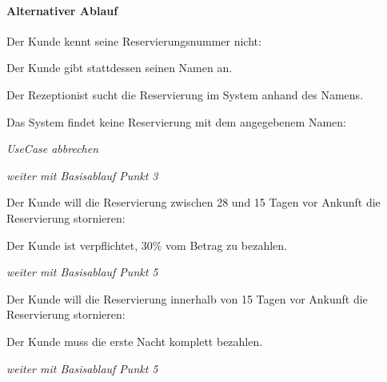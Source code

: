 \paragraph{Alternativer Ablauf}
\begin{longenum}
	\item
	\begin{longenum}
		\item Der \Gls{Kunde} kennt seine \Gls{Reservierungsnummer} nicht:
		\begin{longenum}
			\item Der \Gls{Kunde} gibt stattdessen seinen Namen an.
			\item Der \Gls{Rezeptionist} sucht die \Gls{Reservierung} im System anhand des Namens.
			\begin{longenum}
				\item Das System findet keine \Gls{Reservierung} mit dem angegebenem Namen:
				\begin{longenum}
					\item \emph{UseCase abbrechen}
				\end{longenum}
			\end{longenum}
			\item \emph{weiter mit Basisablauf Punkt 3}
		\end{longenum}
	\end{longenum}
	
	\item
	\item
	\item
	\begin{longenum}
		\item Der \Gls{Kunde} will die Reservierung zwischen 28 und 15 Tagen vor Ankunft die Reservierung stornieren:
		\begin{longenum}
			\item Der \Gls{Kunde} ist verpflichtet, 30\% vom Betrag zu bezahlen.
			\item \emph{weiter mit Basisablauf Punkt 5}
		\end{longenum}
		\item Der \Gls{Kunde} will die Reservierung innerhalb von 15 Tagen vor Ankunft die Reservierung stornieren:
		\begin{longenum}
			\item Der \Gls{Kunde} muss die erste Nacht komplett bezahlen.
			\item \emph{weiter mit Basisablauf Punkt 5}
		\end{longenum}
	\end{longenum}
	
	\item
\end{longenum}

